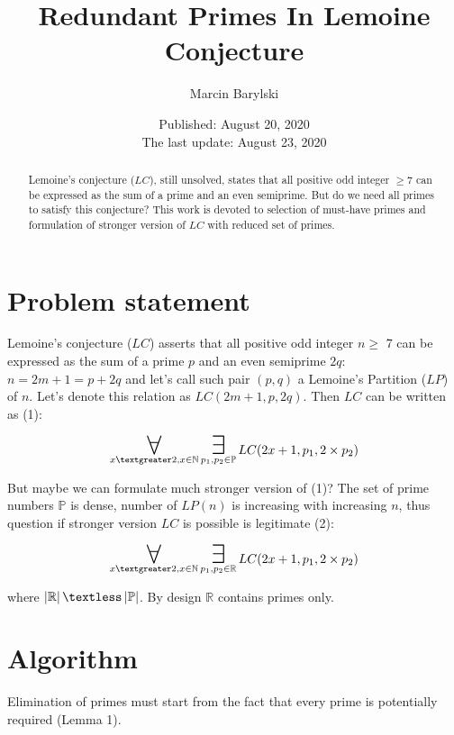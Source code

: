 \documentclass[10pt,twocolumn]{article}
\title{Redundant Primes In Lemoine Conjecture}
\author{Marcin Barylski}
\date{\small{Published: August 20, 2020 \\ The last update: August 23, 2020}}
\newcommand\bigforall{\mbox{\huge $\mathsurround0pt\forall$}}
\newcommand\bigexists{\mbox{\huge $\mathsurround0pt\exists$}}
\begin{document}
\maketitle

\begin{abstract}
Lemoine's conjecture ($LC$), still unsolved, states that all positive odd integer $\geq 7$ can be expressed as the sum of a prime and an even semiprime. But do we need all primes to satisfy this conjecture? This work is devoted to selection of must-have primes and formulation of stronger version of $LC$ with reduced set of primes.
\end{abstract}

\section{Problem statement}

Lemoine's conjecture ($LC$) \cite{Lemoine1896} asserts that all positive odd integer $n \geq$ 7 can be expressed as the sum of a prime $p$ and an even semiprime $2q$: $n = 2m + 1 = p + 2q$ and let's call such pair $(p, q)$ a Lemoine's Partition ($LP$) of $n$. Let's denote this relation as $LC (2m+1, p, 2q)$. Then $LC$ can be written as (1):

\begin{equation}
\displaystyle\mathop{\bigforall}_{x \textgreater 2, x \in \mathbb{N}} \displaystyle\mathop{\bigexists}_{p_1, p_2 \in \mathbb{P}} LC (2x+1, p_1, 2 \times p_2)
\end{equation}

But maybe we can formulate much stronger version of (1)? The set of prime numbers $\mathbb{P}$ is dense, number of $LP(n)$ is increasing with increasing $n$, thus question if stronger version $LC$ is possible is legitimate (2):

\begin{equation}
\displaystyle\mathop{\bigforall}_{x \textgreater 2, x \in \mathbb{N}} \displaystyle\mathop{\bigexists}_{p_1, p_2 \in \mathbb{R}} LC (2x+1, p_1, 2 \times p_2)
\end{equation}

where $\left\vert \mathbb{R} \right\vert \textless \left\vert \mathbb{P} \right\vert$. By design $\mathbb{R}$ contains primes only.

\section{Algorithm}

Elimination of primes must start from the fact that every prime is potentially required (Lemma 1).
\end{document}
